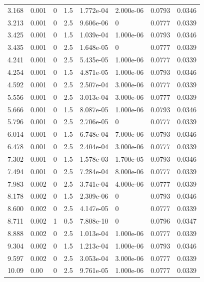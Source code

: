 \documentclass[preview]{standalone}
\begin{document}
{{\begin{tabular}{L{1.2cm}C{1.2cm} C{0.3cm}C{0.5cm} C{1.4cm}C{1.4cm} C{1.4cm}C{1.4cm}}
  3.168  &  0.001  & 0     & 1.5 &  1.772e-04  & 2.000e-06  & 0.0793 &  0.0346   \\ 
  3.213  &  0.001  & 0     & 2.5 &  9.606e-06  & 0  & 0.0777 &  0.0339   \\ 
  3.425  &  0.001  & 0     & 1.5 &  1.039e-04  & 1.000e-06  & 0.0793 &  0.0346   \\ 
  3.435  &  0.001  & 0     & 2.5 &  1.648e-05  & 0  & 0.0777 &  0.0339   \\ 
  4.241  &  0.001  & 0     & 2.5 &  5.435e-05  & 1.000e-06  & 0.0777 &  0.0339   \\ 
  4.254  &  0.001  & 0     & 1.5 &  4.871e-05  & 1.000e-06  & 0.0793 &  0.0346   \\ 
  4.592  &  0.001  & 0     & 2.5 &  2.507e-04  & 3.000e-06  & 0.0777 &  0.0339   \\ 
  5.556  &  0.001  & 0     & 2.5 &  3.013e-04  & 3.000e-06  & 0.0777 &  0.0339   \\ 
  5.666  &  0.001  & 0     & 1.5 &  8.087e-05  & 1.000e-06  & 0.0793 &  0.0346   \\ 
  5.796  &  0.001  & 0     & 2.5 &  2.706e-05  & 0  & 0.0777 &  0.0339   \\ 
  6.014  &  0.001  & 0     & 1.5 &  6.748e-04  & 7.000e-06  & 0.0793 &  0.0346   \\ 
  6.478  &  0.001  & 0     & 2.5 &  2.404e-04  & 3.000e-06  & 0.0777 &  0.0339   \\ 
  7.302  &  0.001  & 0     & 1.5 &  1.578e-03  & 1.700e-05  & 0.0793 &  0.0346   \\ 
  7.494  &  0.001  & 0     & 2.5 &  7.284e-04  & 8.000e-06  & 0.0777 &  0.0339   \\ 
  7.983  &  0.002  & 0     & 2.5 &  3.741e-04  & 4.000e-06  & 0.0777 &  0.0339   \\ 
  8.178  &  0.002  & 0     & 1.5 &  2.309e-06  & 0  & 0.0793 &  0.0346   \\ 
  8.600  &  0.002  & 0     & 2.5 &  4.147e-05  & 0  & 0.0777 &  0.0339   \\ 
  8.711  &  0.002  & 1     & 0.5 &  7.808e-10  & 0  & 0.0796 &  0.0347   \\ 
  8.888  &  0.002  & 0     & 2.5 &  1.013e-04  & 1.000e-06  & 0.0777 &  0.0339   \\ 
  9.304  &  0.002  & 0     & 1.5 &  1.213e-04  & 1.000e-06  & 0.0793 &  0.0346   \\ 
  9.597  &  0.002  & 0     & 2.5 &  3.053e-04  & 3.000e-06  & 0.0777 &  0.0339   \\ 
  10.09  &  0.00  & 0     & 2.5 &  9.761e-05  & 1.000e-06  & 0.0777 &  0.0339   \\ 

\end{tabular}}}
\end{document}
